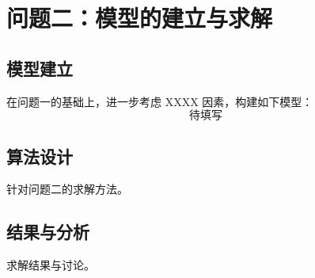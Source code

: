 \section{问题二：模型的建立与求解}

\subsection{模型建立}
在问题一的基础上，进一步考虑 XXXX 因素，构建如下模型：
\begin{equation}
    \text{待填写}
    \label{eq:model2}
\end{equation}

\subsection{算法设计}
针对问题二的求解方法。

\subsection{结果与分析}
求解结果与讨论。
